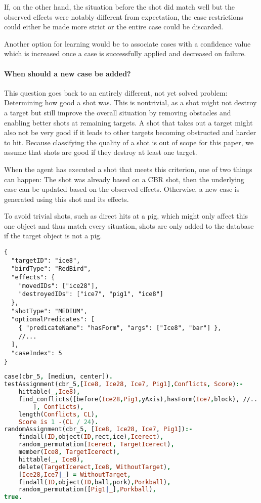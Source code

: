 If, on the other hand, the situation before the shot did match well but the observed effects were notably different from expectation, the case restrictions could either be made more strict or the entire case could be discarded.

Another option for learning would be to associate cases with a confidence value which is increased once a case is successfully applied and decreased on failure.

\paragraph{When should a new case be added?}
This question goes back to an entirely different, not yet solved problem: Determining how good a shot was.
This is nontrivial, as a shot might not destroy a target but still improve the overall situation by removing obstacles and enabling better shots at remaining targets.
A shot that takes out a target might also not be very good if it leads to other targets becoming obstructed and harder to hit.
Because classifying the quality of a shot is out of scope for this paper, we assume that shots are good if they destroy at least one target.

When the agent has executed a shot that meets this criterion, one of two things can happen: The shot was already based on a \ac{CBR} shot, then the underlying case can be updated based on the observed effects. Otherwise, a new case is generated using this shot and its effects.

To avoid trivial shots, such as direct hits at a pig, which might only affect this one object and thus match every situation, shots are only added to the database if the target object is not a pig.

\begin{lstlisting}[caption=case information outside of Prolog]
{
  "targetID": "ice8",
  "birdType": "RedBird",
  "effects": {
    "movedIDs": ["ice28"],
    "destroyedIDs": ["ice7", "pig1", "ice8"]
  },
  "shotType": "MEDIUM",
  "optionalPredicates": [
    { "predicateName": "hasForm", "args": ["Ice8", "bar"] },
    //...
  ],
  "caseIndex": 5
}    
\end{lstlisting}

\begin{lstlisting}[label=lst:case-prolog, language=Prolog, caption=case information in Prolog]
case(cbr_5, [medium, center]).
testAssignment(cbr_5,[Ice8, Ice28, Ice7, Pig1],Conflicts, Score):-
    hittable(_,Ice8),
    find_conflicts([before(Ice28,Pig1,yAxis),hasForm(Ice7,block), //...
        ], Conflicts),
    length(Conflicts, CL),
    Score is 1 -(CL / 24).
randomAssignment(cbr_5, [Ice8, Ice28, Ice7, Pig1]):-
    findall(ID,object(ID,rect,ice),Icerect),
    random_permutation(Icerect, TargetIcerect),
    member(Ice8, TargetIcerect),
    hittable(_, Ice8),
    delete(TargetIcerect,Ice8, WithoutTarget),
    [Ice28,Ice7|_] = WithoutTarget,
    findall(ID,object(ID,ball,pork),Porkball),
    random_permutation([Pig1|_],Porkball),
true.
\end{lstlisting}